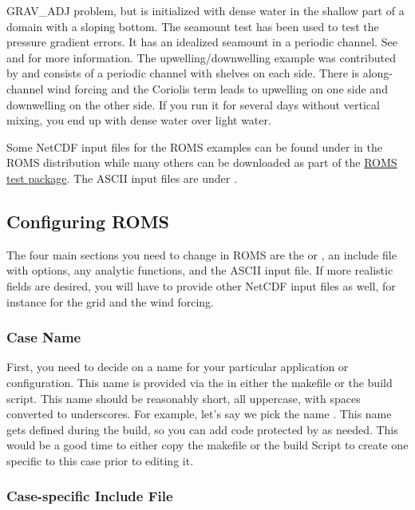 \begin{klist}
 GRAV\_ADJ problem, but is initialized with dense water in the shallow
part of a domain with a sloping bottom.
      The seamount test has been used to test the pressure
 gradient errors.  It has an idealized seamount in a periodic channel.
 See \citet{BH93} and \citet{McCalpin94} for more information.
     The upwelling/downwelling example was
 contributed by \citet{Macks93}
 and consists of a periodic channel with shelves on each side.
 There is along-channel wind forcing and the Coriolis term leads
 to upwelling on one side and downwelling on the other side. If
 you run it for several days without vertical mixing, you end up with
 dense water over light water.
\end{klist}
Some NetCDF input files for the ROMS examples can be found under
 in the ROMS distribution while many others can be
downloaded as part of the \href{http://www.myroms.org/svn/src/test}{ROMS
test package}. The ASCII input files are under .

\subsection{Configuring ROMS}
\label{User}

The four main sections you need to change in ROMS are the 
or , an include file with  options, any
analytic functions, and the ASCII input file. If more realistic fields
are desired, you will have to provide other NetCDF input files as well, for
instance for the grid and the wind forcing.

\subsubsection{Case Name}

First, you need to decide on a name for your particular application or
configuration. This name is provided via the  in
either the makefile or the build script. This name should be reasonably
short, all uppercase, with spaces converted to underscores. For example,
let's say we pick the name . This name gets defined
during the build, so you can add code protected by  as needed. This would be a good time to either copy the
makefile or the build Script to create one specific to this case prior
to editing it.

\subsubsection{ Case-specific Include File}

